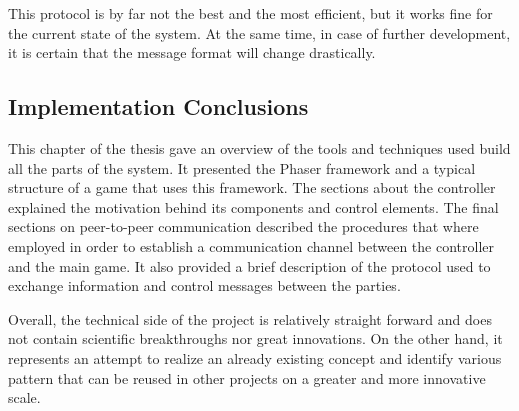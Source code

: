 



This protocol is by far not the best and the most efficient, but it works fine
for the current state of the system. At the same time, in case of further
development, it is certain that the message format will change drastically.

\subsection{Implementation Conclusions}

This chapter of the thesis gave an overview of the tools and techniques used
build all the parts of the system. It presented the Phaser framework and a
typical structure of a game that uses this framework. The sections about the
controller explained the motivation behind its components and control elements.
The final sections on peer-to-peer communication described the procedures that
where employed in order to establish a communication channel between the
controller and the main game. It also provided a brief description of the
protocol used to exchange information and control messages between the parties.

Overall, the technical side of the project is relatively straight forward and
does not contain scientific breakthroughs nor great innovations. On the other
hand, it represents an attempt to realize an already existing concept and
identify various pattern that can be reused in other projects on a greater and
more innovative scale.

\clearpage
